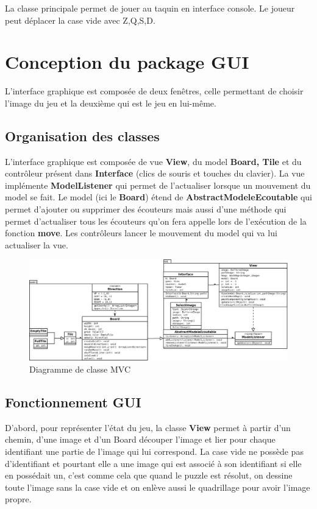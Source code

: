 \documentclass[a4paper,12pt]{article} %
\begin{document}
La classe principale permet de jouer au taquin en interface console. Le joueur peut déplacer la case vide avec Z,Q,S,D.

\section{Conception du package GUI}

L'interface graphique est composée de deux fenêtres, celle permettant de choisir l'image du jeu et la deuxième qui est le jeu en lui-même.

\subsection{Organisation des classes}

L'interface graphique est composée de vue \textbf{View}, du model \textbf{Board, Tile} et du contrôleur présent dans \textbf{Interface} (clics de souris et touches du clavier). La vue implémente \textbf{ModelListener} qui permet de l'actualiser lorsque un mouvement du model se fait. Le model (ici le \textbf{Board}) étend de \textbf{AbstractModeleEcoutable} qui permet d'ajouter ou supprimer des écouteurs mais aussi d'une méthode qui permet d'actualiser tous les écouteurs qu'on fera appelle lors de l'exécution de la fonction \textbf{move}. Les contrôleurs lancer le mouvement du model qui va lui actualiser la vue.

\begin{figure}[!h]
\centering
\includegraphics[scale=0.25]{images/mvc.png}
\caption{Diagramme de classe MVC}
\end{figure}
 

\subsection{Fonctionnement GUI}

D'abord, pour représenter l'état du jeu, la classe \textbf{View} permet à partir d'un chemin, d'une image et d'un Board découper l'image et lier pour chaque identifiant une partie de l'image qui lui correspond. La case vide ne possède pas d'identifiant et pourtant elle a une image qui est associé à son identifiant si elle en possédait un, c'est comme cela que quand le puzzle est résolut, on dessine toute l'image sans la case vide et on enlève aussi le quadrillage pour avoir l'image propre.
\end{document}
